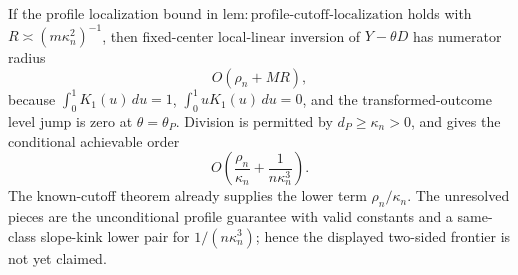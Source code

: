 If the profile localization bound in
\(\mathrm{lem:profile\mbox{-}cutoff\mbox{-}localization}\) holds with
\(R\asymp(m\kappa_n^2)^{-1}\), then fixed-center local-linear inversion
of \(Y-\theta D\) has numerator radius
\[
 O\!\left(\rho_n+MR\right),
\]
because \(\int_0^1K_1(u)\,du=1\),
\(\int_0^1uK_1(u)\,du=0\), and the transformed-outcome level jump is
zero at \(\theta=\theta_P\).  Division is permitted by
\(d_P\ge\kappa_n>0\), and gives the conditional achievable order
\[
 O\!\left(\frac{\rho_n}{\kappa_n}
          +\frac1{n\kappa_n^3}\right).
\]
The known-cutoff theorem already supplies the lower term
\(\rho_n/\kappa_n\).  The unresolved pieces are the unconditional
profile guarantee with valid constants and a same-class slope-kink
lower pair for \(1/(n\kappa_n^3)\); hence the displayed two-sided
frontier is not yet claimed.
